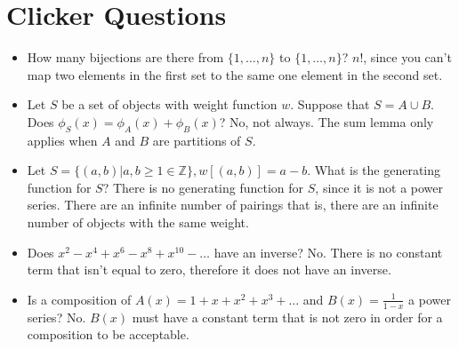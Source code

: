 \documentclass[]{article}
\theoremstyle{definition}
\newcommand{\union}{\cup}
\newcommand{\lecture}[1]{\marginpar{{\footnotesize $\leftarrow$ \underline{#1}}}}
\begin{document}
	\newpage
	\section{Clicker Questions}
		\lecture{January 21, 2013}
		\begin{itemize}
			\item How many bijections are there from $\{1, \ldots, n\}$ to $\{1, \ldots, n\}$? $n!$, since you can't map two elements in the first set to the same one element in the second set.
			\item Let $S$ be a set of objects with weight function $w$. Suppose that $S = A \union B$. Does $\phi_S(x) = \phi_A(x) + \phi_B(x)$? No, not always. The sum lemma only applies when $A$ and $B$ are partitions of $S$.
			\item Let $S = \{(a, b) | a, b \ge 1 \in \mathbb{Z}\}, w[(a, b)] = a - b$. What is the generating function for $S$? There is no generating function for $S$, since it is not a power series. There are an infinite number of pairings \textendash{} that is, there are an infinite number of objects with the same weight.
			\item Does $x^2 - x^4 + x^6 - x^8 + x^10 - \ldots$ have an inverse? No. There is no constant term that isn't equal to zero, therefore it does not have an inverse.
			\item Is a composition of $A(x) = 1 + x + x^2 + x^3 + \ldots$ and $B(x) = \frac{1}{1 - x}$ a power series? No. $B(x)$ must have a constant term that is not zero in order for a composition to be acceptable.
		\end{itemize}
\end{document}
